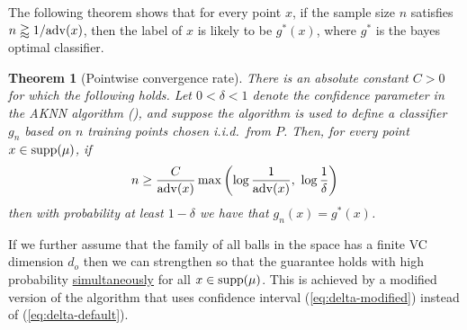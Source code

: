 \documentclass{article}
\def\supp{{\rm supp}}
\def\adv{{\rm adv}}
\newtheorem{theorem}{Theorem}
\newcommand{\comment}[3]{{\color{#1} {\bf #2 :} #3}}
\newcommand{\new}[1]{\color{red} #1}
\newcommand{\shay}[1]{\comment{purple}{Shay}{#1}}
\begin{document}

{\new{The following theorem shows that for every point $x$,
if the sample size $n$ satisfies $n\gtrapprox 1/\adv(x)$,
then the label of $x$ is likely to be $g^*(x)$, where $g^*$ is the bayes optimal classifier.}}

\begin{theorem}[Pointwise convergence rate]
There is an absolute constant $C > 0$ for which the following holds.
Let $0 < \delta < 1$ denote the confidence parameter in the AKNN algorithm (),
and suppose the algorithm is used to define a classifier $g_n$ based on $n$ training points chosen i.i.d.\ from $P$. 
Then, for every point $x\in\supp(\mu)$, if
\[n \geq \frac{C}{\adv(x)} \max \left( \log \frac{1}{\adv(x)}, \ \log \frac{1}{\delta} \right)\]
then with probability at least $1-\delta$ we have that $g_n(x)=g^*(x)$.
\label{thm:pointwise-rate}
\end{theorem}



{\new{If we further assume that the family of all balls in the space has a finite VC dimension $d_o$ then 
we can strengthen \Cref{thm:pointwise-rate} so that the guarantee holds with high probability \underline{simultaneously} for all $x\in \supp(\mu)$.
This is achieved by a modified version of the algorithm that uses confidence interval (\ref{eq:delta-modified}) instead of (\ref{eq:delta-default}).}}
\end{document}
